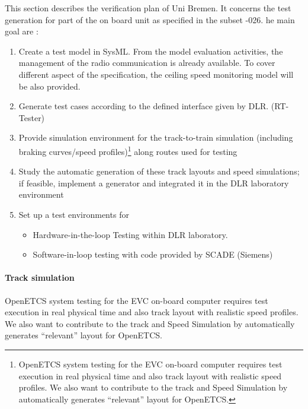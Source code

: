 
This section describes the verification plan of Uni Bremen. It
concerns the test generation for part of the on board unit as
specified in the subset -026. he main goal are :

\begin{enumerate}
\item Create a test model in SysML. From the model evaluation
  activities, the management of the radio communication is already
  available. To cover different aspect of the specification, the
  ceiling speed monitoring model will be also provided.
\item Generate test cases according to the defined interface given by
  DLR. (RT-Tester) 
\item Provide simulation environment for the
  track-to-train simulation (including braking curves/speed
  profiles)\footnote{ OpenETCS system testing for the EVC on-board
    computer requires test execution in real physical time and also
    track layout with realistic speed profiles.  We also want to
    contribute to the track and Speed Simulation by automatically
    generates ``relevant'' layout for OpenETCS.}  along routes used
  for testing
\item Study the automatic generation of these track layouts and speed
  simulations; if feasible, implement a generator and integrated it in
  the DLR laboratory environment
\item Set up a test environments for
  \begin{itemize}  
  \item Hardware-in-the-loop Testing within DLR laboratory.
  \item Software-in-loop testing with code provided by SCADE (Siemens)
  \end{itemize}
\end{enumerate}


\paragraph{Track simulation}
OpenETCS system testing for the EVC on-board computer requires test
execution in real physical time and also track layout with realistic
speed profiles.  We also want to contribute to the track and Speed
Simulation by automatically generates ``relevant'' layout for
OpenETCS.




